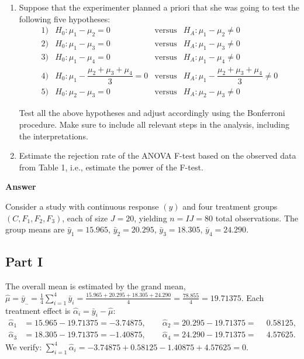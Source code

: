 \documentclass[letterpaper]{article}
\begin{document}
\begin{enumerate}
			\item[(vi)] Suppose that the experimenter planned a priori that she was going to test the following five hypotheses:
			\[
			\begin{array}{rllll}
				1) & H_0:\mu_1-\mu_2=0 & \text{versus} & H_A:\mu_1-\mu_2\neq 0 \\
				2) & H_0:\mu_1-\mu_3=0 & \text{versus} & H_A:\mu_1-\mu_3\neq 0 \\
				3) & H_0:\mu_1-\mu_4=0 & \text{versus} & H_A:\mu_1-\mu_4\neq 0 \\
				4) & H_0:\mu_1-\dfrac{\mu_2+\mu_3+\mu_4}{3}=0 & \text{versus} & H_A:\mu_1-\dfrac{\mu_2+\mu_3+\mu_4}{3}\neq 0 \\
				5) & H_0:\mu_2-\mu_3=0 & \text{versus} & H_A:\mu_2-\mu_3\neq 0
			\end{array}
			\]
			
			Test all the above hypotheses and adjust accordingly using the Bonferroni procedure. Make sure to include all relevant steps in the analysis, including the interpretations.
			
			\item[(vii)] Estimate the rejection rate of the ANOVA F-test based on the observed data from Table 1, i.e., estimate the power of the F-test.
		\end{enumerate}
		
		\textbf{Answer}
		
		Consider a study with continuous response $(y)$ and four treatment groups $(C, F_1, F_2, F_3)$,
		each of size $J = 20$, yielding $n = IJ = 80$ total observations.
		The group means are $\bar{y}_1 = 15.965$, $\bar{y}_2 = 20.295$, $\bar{y}_3 = 18.305$,
		$\bar{y}_4 = 24.290$.
		
			
		\subsection{Part I}
		
		The overall mean is estimated by the grand mean,
		$\hat{\mu} = \bar{y}_{..} = \frac{1}{4}\sum_{i=1}^{4}\bar{y}_i
		= \frac{15.965 + 20.295 + 18.305 + 24.290}{4} = \frac{78.855}{4} = 19.71375$.
		Each treatment effect is $\hat{\alpha}_i = \bar{y}_i - \hat{\mu}$:
		\begin{align*}
			\hat{\alpha}_1 &= 15.965 - 19.71375 = -3.74875, \qquad
			\hat{\alpha}_2  = 20.295 - 19.71375 = \phantom{-}0.58125, \\
			\hat{\alpha}_3 &= 18.305 - 19.71375 = -1.40875, \qquad
			\hat{\alpha}_4  = 24.290 - 19.71375 = \phantom{-}4.57625.
		\end{align*}
		We verify: $\sum_{i=1}^{4}\hat{\alpha}_i = -3.74875 + 0.58125 - 1.40875 + 4.57625 = 0$.
		
\end{document}
